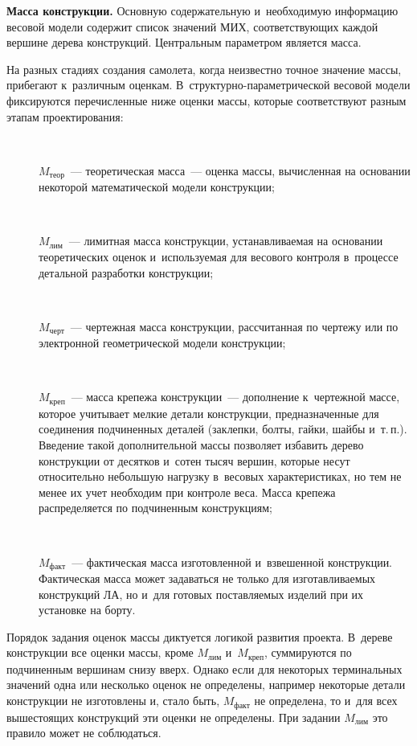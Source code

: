 \begin{multicols}{2}
  \textbf{Масса конструкции.} Основную содержательную и~необходимую 
информацию весовой модели содержит список значений  
МИХ, соответствующих каждой 
вершине дерева конструкций. Центральным параметром является масса. 
  
  На разных стадиях создания самолета, когда неизвестно точное значение 
массы, прибегают к~различным оценкам.  
В~струк\-тур\-но-па\-ра\-мет\-ри\-че\-ской весовой модели фиксируются 
перечисленные ниже оценки массы, которые соответствуют разным этапам 
проектирования:
  \begin{description}
\item[\,]  $M_{\mathrm{теор}}$~--- теоретическая масса~--- оценка массы, вычисленная на 
основании некоторой математической модели конструкции; 
  
\item[\,]  $M_{\mathrm{лим}}$~--- лимитная масса конструкции, уста\-нав\-ли\-ва\-емая на 
основании теоретических оценок и~используемая для весового контроля 
в~процессе детальной разработки конструкции;
  
\item[\,]  $M_{\mathrm{черт}}$~--- чертежная масса конструкции, рассчитанная по чертежу или по 
электронной гео\-мет\-ри\-че\-ской модели конструкции;
  
\item[\,]  $M_{\mathrm{креп}}$~--- масса крепежа конструкции~--- дополнение к~чертежной массе, 
которое учитывает мелкие детали конструкции, предназначенные для 
соединения подчиненных деталей (заклепки, болты, гайки, шайбы и~т.\,п.). 
Введение такой дополнительной массы позволяет избавить дерево конструкции 
от десятков и~сотен тысяч вершин, которые несут относительно небольшую 
нагрузку в~весовых характеристиках, но тем не менее их учет необходим при 
контроле веса. Масса крепежа распределяется по подчиненным конструкциям;  
\item[\,]  $M_{\mathrm{факт}}$~--- фактическая масса изготовленной 
и~взвешенной конструкции. 
Фактическая масса может задаваться не только для изготавливаемых 
конструкций ЛА, но и~для готовых по\-став\-ля\-емых 
изделий при их установке на борту.
\end{description}
  
  Порядок задания оценок массы диктуется логикой развития проекта. 
В~дереве конструкции все оценки массы, кроме $M_{\mathrm{лим}}$ и~$M_{\mathrm{креп}}$, 
суммируются по подчиненным вершинам снизу вверх. Однако если для 
некоторых терминальных значений одна или несколько оценок не определены, 
например некоторые детали конструкции не изготовлены и, стало быть, 
$M_{\mathrm{факт}}$ не определена, то и~для всех вышестоящих конструкций эти оценки не 
определены. При задании $M_{\mathrm{лим}}$ это правило может не соблюдаться. 
  

\end{multicols}
